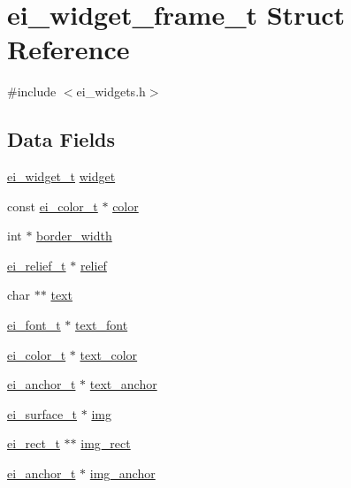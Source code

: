\hypertarget{structei__widget__frame__t}{\section{ei\-\_\-widget\-\_\-frame\-\_\-t Struct Reference}
\label{structei__widget__frame__t}
}


{\ttfamily \#include $<$ei\-\_\-widgets.\-h$>$}

\subsection*{Data Fields}
\begin{DoxyCompactItemize}
\item 
\hyperlink{structei__widget__t}{ei\-\_\-widget\-\_\-t} \hyperlink{structei__widget__frame__t_ad375e0d41821e8f1dcf5e061d140ac0d}{widget}
\item 
const \hyperlink{structei__color__t}{ei\-\_\-color\-\_\-t} $\ast$ \hyperlink{structei__widget__frame__t_a0e34c2b62115ecf31f7f8bb6219005ce}{color}
\item 
int $\ast$ \hyperlink{structei__widget__frame__t_a0b242994ad47f437b25e53106bc4726b}{border\-\_\-width}
\item 
\hyperlink{ei__types_8h_aa79a32b1d8ece0e44cfa394e870b270b}{ei\-\_\-relief\-\_\-t} $\ast$ \hyperlink{structei__widget__frame__t_a8e597038a1f61dae86b5f27bef78bfee}{relief}
\item 
char $\ast$$\ast$ \hyperlink{structei__widget__frame__t_ac7a94855acf51ebccf61827ed81ed4d0}{text}
\item 
\hyperlink{ei__types_8h_a22c8198e4d641e4bc67bb17f9c6bcda7}{ei\-\_\-font\-\_\-t} $\ast$ \hyperlink{structei__widget__frame__t_a63f5b7da07b35a391b4e5280a1b2c982}{text\-\_\-font}
\item 
\hyperlink{structei__color__t}{ei\-\_\-color\-\_\-t} $\ast$ \hyperlink{structei__widget__frame__t_afcbf12b8f0763cf402873b246b94296d}{text\-\_\-color}
\item 
\hyperlink{ei__types_8h_a3852c963af609d31d7cfcff79c4c8450}{ei\-\_\-anchor\-\_\-t} $\ast$ \hyperlink{structei__widget__frame__t_af56c6236bb9f5451fbfcaf12ae9c10bd}{text\-\_\-anchor}
\item 
\hyperlink{hw__interface_8h_ad9970ae727c438faaf09c58c5defb796}{ei\-\_\-surface\-\_\-t} $\ast$ \hyperlink{structei__widget__frame__t_a9780a39c2cd0e785af1905932082c71c}{img}
\item 
\hyperlink{structei__rect__t}{ei\-\_\-rect\-\_\-t} $\ast$$\ast$ \hyperlink{structei__widget__frame__t_aacfdf74bb9814b393106ff891c951487}{img\-\_\-rect}
\item 
\hyperlink{ei__types_8h_a3852c963af609d31d7cfcff79c4c8450}{ei\-\_\-anchor\-\_\-t} $\ast$ \hyperlink{structei__widget__frame__t_a72c13290dd6e955f3dbc94d753c40bdd}{img\-\_\-anchor}
\end{DoxyCompactItemize}


